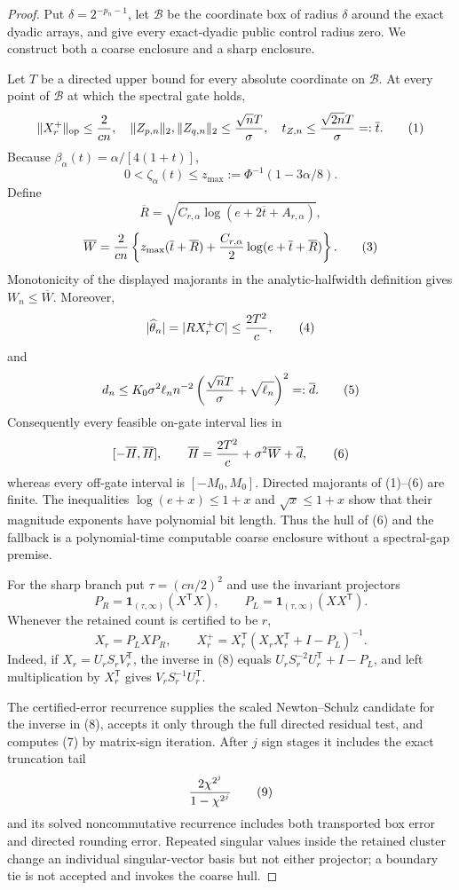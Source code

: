 \documentclass{article}
\begin{document}
\begin{proof}
Put \(\delta=2^{-p_n-1}\), let \(\mathcal B\) be the coordinate box of radius
\(\delta\) around the exact dyadic arrays, and give every exact-dyadic public
control radius zero.  We construct both a coarse enclosure and a sharp
enclosure.

Let \(T\) be a directed upper bound for every absolute coordinate on
\(\mathcal B\).  At every point of \(\mathcal B\) at which the spectral gate
holds,
\[
\|X_r^+\|_{
\mathrm{op}}\le {2\over cn},
\quad
\|Z_{p,n}\|_2,\|Z_{q,n}\|_2\le {\sqrt nT\over\sigma},
\quad
t_{Z,n}\le {\sqrt{2n}T\over\sigma}=:\overline t.                    \tag{1}
\]
Because \(\beta_\alpha(t)=\alpha/[4(1+t)]\),
\[
0<\zeta_\alpha(t)\le z_{
\max}:=\Phi^{-1}(1-3\alpha/8).                                       \tag{2}
\]
Define
\[
\overline R=\sqrt{C_{r,\alpha}\log(e+2\overline t+A_{r,\alpha})},
\]
\[
\overline W={2\over cn}
\left\{z_{
\max}(\overline t+\overline R)
+{C_{r,\alpha}\over2}\log(e+\overline t+\overline R)\right\}.      \tag{3}
\]
Monotonicity of the displayed majorants in the analytic-halfwidth definition
gives \(W_n\le\overline W\).  Moreover,
\[
|\widehat\theta_n|=|RX_r^+C|\le {2T^2\over c},                       \tag{4}
\]
and
\[
d_n\le K_0\sigma^2\ell_n n^{-2}
\left({\sqrt nT\over\sigma}+\sqrt{\ell_n}\right)^2=:\overline d.   \tag{5}
\]
Consequently every feasible on-gate interval lies in
\[
[-\overline H,\overline H],\qquad
\overline H={2T^2\over c}+\sigma^2\overline W+\overline d,           \tag{6}
\]
whereas every off-gate interval is \([-M_0,M_0]\).  Directed majorants of
(1)--(6) are finite.  The inequalities \(\log(e+x)\le1+x\) and
\(\sqrt x\le1+x\) show that their magnitude exponents have polynomial bit
length.  Thus the hull of (6) and the fallback is a polynomial-time computable
coarse enclosure without a spectral-gap premise.

For the sharp branch put \(\tau=(cn/2)^2\) and use the invariant projectors
\[
P_R=\mathbf1_{(\tau,\infty)}(X^{\mathsf T}X),
\qquad
P_L=\mathbf1_{(\tau,\infty)}(XX^{\mathsf T}).                         \tag{7}
\]
Whenever the retained count is certified to be \(r\),
\[
X_r=P_LXP_R,
\qquad
X_r^+=X_r^{\mathsf T}(X_rX_r^{\mathsf T}+I-P_L)^{-1}.                \tag{8}
\]
Indeed, if \(X_r=U_rS_rV_r^{\mathsf T}\), the inverse in (8) equals
\(U_rS_r^{-2}U_r^{\mathsf T}+I-P_L\), and left multiplication by
\(X_r^{\mathsf T}\) gives \(V_rS_r^{-1}U_r^{\mathsf T}\).

The certified-error recurrence supplies the scaled Newton--Schulz candidate for
the inverse in (8), accepts it only through the full directed residual test, and
computes (7) by matrix-sign iteration.  After \(j\) sign stages it includes the
exact truncation tail
\[
{2\chi^{2^j}\over1-\chi^{2^j}}                                      \tag{9}
\]
and its solved noncommutative recurrence includes both transported box error and
directed rounding error.  Repeated singular values inside the retained cluster
change an individual singular-vector basis but not either projector; a boundary
tie is not accepted and invokes the coarse hull.


\end{proof}
\end{document}
